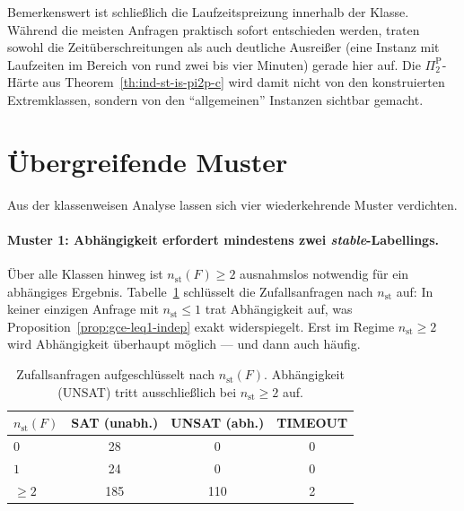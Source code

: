 Bemerkenswert ist schlie\ss lich die Laufzeitspreizung innerhalb der Klasse.
W\"ahrend die meisten Anfragen praktisch sofort entschieden werden, traten
sowohl die Zeit\"uberschreitungen als auch deutliche Ausrei\ss er (eine Instanz
mit Laufzeiten im Bereich von rund zwei bis vier Minuten) gerade hier auf. Die
\(\Pi_2^{\mathrm P}\)-H\"arte aus Theorem~\ref{th:ind-st-is-pi2p-c} wird damit
nicht von den konstruierten Extremklassen, sondern von den
\enquote{allgemeinen} Instanzen sichtbar gemacht.

\section{\"Ubergreifende Muster}
\label{sec:gce-muster}

Aus der klassenweisen Analyse lassen sich vier wiederkehrende Muster
verdichten.

\paragraph{Muster 1: Abh\"angigkeit erfordert mindestens zwei
\textit{stable}-Labellings.}
\"Uber alle Klassen hinweg ist \(n_{\mathrm{st}}(F)\geq 2\) ausnahmslos
notwendig f\"ur ein abh\"angiges Ergebnis. Tabelle~\ref{tab:gce-master}
schl\"usselt die Zufallsanfragen nach \(n_{\mathrm{st}}\) auf: In keiner
einzigen Anfrage mit \(n_{\mathrm{st}}\leq 1\) trat Abh\"angigkeit auf, was
Proposition~\ref{prop:gce-leq1-indep} exakt widerspiegelt. Erst im Regime
\(n_{\mathrm{st}}\geq2\) wird Abh\"angigkeit \"uberhaupt m\"oglich --- und dann
auch h\"aufig.

\begin{table}[htbp]
    \myfloatalign
    \begin{tabularx}{\textwidth}{Xccc} \toprule
        \(n_{\mathrm{st}}(F)\) & SAT (unabh.) & UNSAT (abh.) & TIMEOUT \\
        \midrule
        \(0\)       &  28 &   0 & 0 \\
        \(1\)       &  24 &   0 & 0 \\
        \({\geq}2\) & 185 & 110 & 2 \\
        \bottomrule
    \end{tabularx}
    \caption[Abh\"angigkeit nach Anzahl stabiler Labellings]{Zufallsanfragen
    aufgeschl\"usselt nach \(n_{\mathrm{st}}(F)\). Abh\"angigkeit (UNSAT) tritt
    ausschlie\ss lich bei \(n_{\mathrm{st}}\geq2\) auf.}
    \label{tab:gce-master}
\end{table}

